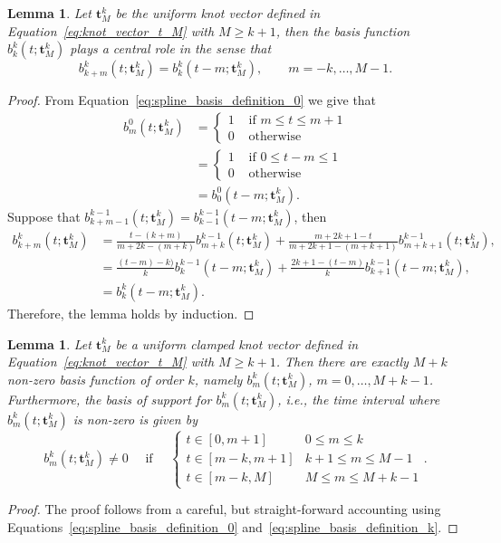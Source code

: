 \documentclass{article}
\newtheorem{lemma}[theorem]{Lemma}
\begin{document}
\begin{lemma} \label{lem:shifted_central_basis}
Let $\mathbf{t}_M^k$ be the uniform knot vector defined in Equation~\eqref{eq:knot_vector_t_M} with $M\geq k+1$, then the basis function $b_k^k(t; \mathbf{t}_M^k)$ plays a central role in the sense that
\[
	b_{k+m}^k(t; \mathbf{t}_M^k) = b_k^k(t-m; \mathbf{t}_M^k), \qquad m=-k, \dots, M-1.
\]
\end{lemma}
\begin{proof}
From Equation~\eqref{eq:spline_basis_definition_0} we give that
\begin{align*}
	b_m^0(t; \mathbf{t}_M^k) &= \begin{cases} 1 & \text{~if~} m \leq t \leq m+1 \\ 
 									 		  0 & \text{~otherwise} 
 					   			\end{cases} 
 					   		\\
 					   		 &= \begin{cases} 1 & \text{~if~} 0 \leq t-m \leq 1 \\ 
 									 		  0 & \text{~otherwise} 
 					   			\end{cases} 
 					   		\\
 					   		&= b_0^0(t-m; \mathbf{t}_M^k).
\end{align*}
Suppose that $b_{k+m-1}^{k-1}(t; \mathbf{t}_M^k) = b_{k-1}^{k-1}(t-m; \mathbf{t}_M^k)$, then
\begin{align*}
b_{k+m}^{k}(t; \mathbf{t}_M^k) 
	&= \frac{t-(k+m)}{m+2k-(m+k)} b_{m+k}^{k-1}(t; \mathbf{t}_M^k) + \frac{m+2k+1-t}{m+2k+1-(m+k+1)} b_{m+k+1}^{k-1}(t; \mathbf{t}_M^k),
	\\	
	&= \frac{(t-m)-k)}{k} b_{k}^{k-1}(t-m; \mathbf{t}_M^k) + \frac{2k+1-(t-m)}{k} b_{k+1}^{k-1}(t-m; \mathbf{t}_M^k),
	\\
	&= b_k^k(t-m; \mathbf{t}_M^k).
\end{align*}
Therefore, the lemma holds by induction.
\end{proof}



\begin{lemma} \label{lem:nonzero_basis_vectors}
	Let $\mathbf{t}_M^k$ be a uniform clamped knot vector defined in Equation~\eqref{eq:knot_vector_t_M} with $M\geq k+1$.
	Then there are exactly $M+k$ non-zero basis function of order $k$, namely $b_m^k(t;\mathbf{t}_M^k)$, $m=0, \dots, M+k-1$.
	Furthermore, the basis of support for $b_m^k(t;\mathbf{t}_M^k)$, i.e., the time interval where $b_m^k(t;\mathbf{t}_M^k)$ is non-zero is given by
		\[
				b_m^k(t;\mathbf{t}_M^k) \neq 0 
				\quad \text{~if~} \quad
				\begin{cases}
				t \in [0, m+1] & 0\leq m \leq k \\
				t \in [m-k, m+1] & k+1 \leq m \leq M-1 \\
				t \in [m-k, M] & M \leq m \leq M+k-1
				\end{cases}.
		\]	
\end{lemma}
\begin{proof}  The proof follows from a careful, but straight-forward accounting using Equations~\eqref{eq:spline_basis_definition_0} and~\eqref{eq:spline_basis_definition_k}.	
\end{proof}
\end{document}
